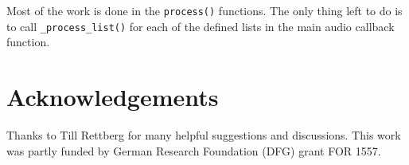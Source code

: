 \documentclass[11pt,letterpaper]{article}
\newcommand{\code}{\texttt}
\begin{document}
Most of the work is done in the \code{process()} functions. The only thing left
to do is to call \code{\string_process\string_list()} for each of the defined
lists in the main audio callback function.

\section{Acknowledgements}

Thanks to Till Rettberg for many helpful suggestions and discussions.
This work was partly funded by German Research Foundation (DFG) grant FOR 1557.

\balance



\end{document}
